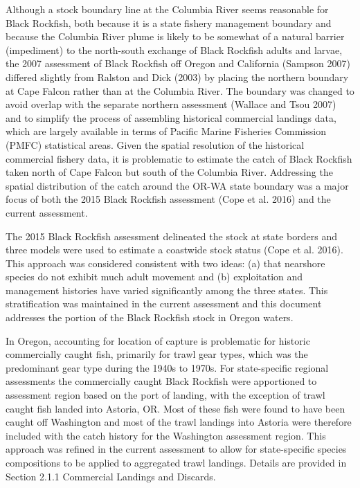 \documentclass[11pt,
  english,
  letterpaper,
]{article}
\begin{document}
Although a stock boundary line at the Columbia River seems reasonable for Black Rockfish, both because it is a state fishery management boundary and because the Columbia River plume is likely to be somewhat of a natural barrier (impediment) to the north-south exchange of Black Rockfish adults and larvae, the 2007 assessment of Black Rockfish off Oregon and California (Sampson 2007) differed slightly from Ralston and Dick (2003) by placing the northern boundary at Cape Falcon rather than at the Columbia River. The boundary was changed to avoid overlap with the separate northern assessment (Wallace and Tsou 2007) and to simplify the process of assembling historical commercial landings data, which are largely available in terms of Pacific Marine Fisheries Commission (PMFC) statistical areas. Given the spatial resolution of the historical commercial fishery data, it is problematic to estimate the catch of Black Rockfish taken north of Cape Falcon but south of the Columbia River. Addressing the spatial distribution of the catch around the OR-WA state boundary was a major focus of both the 2015 Black Rockfish assessment (Cope et al. 2016) and the current assessment.

The 2015 Black Rockfish assessment delineated the stock at state borders and three models were used to estimate a coastwide stock status (Cope et al. 2016). This approach was considered consistent with two ideas: (a) that nearshore species do not exhibit much adult movement and (b) exploitation and management histories have varied significantly among the three states. This stratification was maintained in the current assessment and this document addresses the portion of the Black Rockfish stock in Oregon waters.

In Oregon, accounting for location of capture is problematic for historic commercially caught fish, primarily for trawl gear types, which was the predominant gear type during the 1940s to 1970s. For state-specific regional assessments the commercially caught Black Rockfish were apportioned to assessment region based on the port of landing, with the exception of trawl caught fish landed into Astoria, OR. Most of these fish were found to have been caught off Washington and most of the trawl landings into Astoria were therefore included with the catch history for the Washington assessment region. This approach was refined in the current assessment to allow for state-specific species compositions to be applied to aggregated trawl landings. Details are provided in Section 2.1.1 Commercial Landings and Discards.
\end{document}
